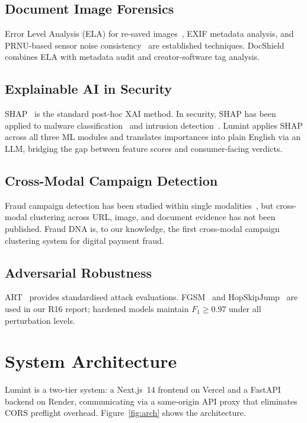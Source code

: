 \documentclass[conference]{IEEEtran}
\begin{document}
\subsection{Document Image Forensics}
Error Level Analysis (ELA) for re-saved images~\cite{krawetz2007},
EXIF metadata analysis, and PRNU-based sensor noise
consistency~\cite{fridrich2009} are established techniques. DocShield
combines ELA with metadata audit and creator-software tag analysis.

\subsection{Explainable AI in Security}
SHAP~\cite{lundberg2017} is the standard post-hoc XAI method. In
security, SHAP has been applied to malware
classification~\cite{imboden2017} and intrusion
detection~\cite{burns2021}. Lumint applies SHAP across all three ML
modules and translates importances into plain English via an LLM,
bridging the gap between feature scores and consumer-facing verdicts.

\subsection{Cross-Modal Campaign Detection}
Fraud campaign detection has been studied within single
modalities~\cite{le2009}, but cross-modal clustering across URL, image,
and document evidence has not been published. Fraud DNA is, to our
knowledge, the first cross-modal campaign clustering system for
digital payment fraud.

\subsection{Adversarial Robustness}
ART~\cite{nicolae2018} provides standardised attack evaluations.
FGSM~\cite{goodfellow2015} and HopSkipJump~\cite{chen2020} are used in
our R16 report; hardened models maintain $F_1{\geq}0.97$ under all
perturbation levels.

\section{System Architecture}

Lumint is a two-tier system: a Next.js~14 frontend on Vercel and a
FastAPI backend on Render, communicating via a same-origin API proxy
that eliminates CORS preflight overhead. Figure~\ref{fig:arch} shows
the architecture.
\end{document}
